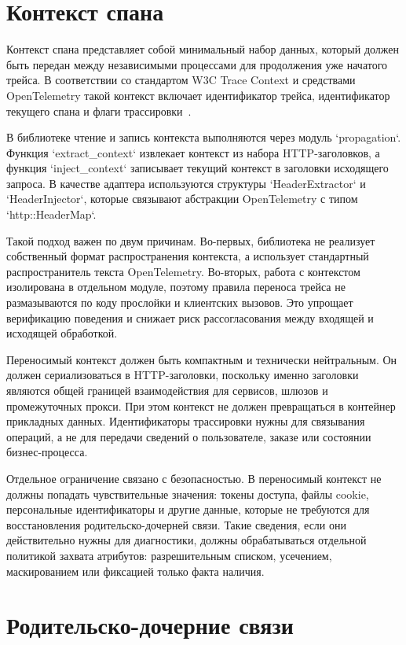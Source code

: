 \section{Контекст спана}

Контекст спана представляет собой минимальный набор данных, который должен быть
передан между независимыми процессами для продолжения уже начатого трейса. В
соответствии со стандартом W3C Trace Context и средствами OpenTelemetry такой
контекст включает идентификатор трейса, идентификатор текущего спана и флаги
трассировки~\cite{w3cTraceContext,opentelemetryPropagationDocs}.

В библиотеке чтение и запись контекста выполняются через модуль `propagation`.
Функция `extract_context` извлекает контекст из набора HTTP-заголовков, а функция
`inject_context` записывает текущий контекст в заголовки исходящего запроса. В
качестве адаптера используются структуры `HeaderExtractor` и `HeaderInjector`,
которые связывают абстракции OpenTelemetry с типом `http::HeaderMap`.

Такой подход важен по двум причинам. Во-первых, библиотека не реализует
собственный формат распространения контекста, а использует стандартный
распространитель текста OpenTelemetry. Во-вторых, работа с контекстом изолирована в
отдельном модуле, поэтому правила переноса трейса не размазываются по коду
прослойки и клиентских вызовов. Это упрощает верификацию поведения и снижает риск
рассогласования между входящей и исходящей обработкой.

Переносимый контекст должен быть компактным и технически нейтральным. Он должен
сериализоваться в HTTP-заголовки, поскольку именно заголовки являются общей
границей взаимодействия для сервисов, шлюзов и промежуточных прокси. При этом
контекст не должен превращаться в контейнер прикладных данных. Идентификаторы
трассировки нужны для связывания операций, а не для передачи сведений о
пользователе, заказе или состоянии бизнес-процесса.

Отдельное ограничение связано с безопасностью. В переносимый контекст не должны
попадать чувствительные значения: токены доступа, файлы cookie, персональные
идентификаторы и другие данные, которые не требуются для восстановления
родительско-дочерней связи. Такие сведения, если они действительно нужны для
диагностики, должны обрабатываться отдельной политикой захвата атрибутов:
разрешительным списком, усечением, маскированием или фиксацией только факта
наличия.

\section{Родительско-дочерние связи}

